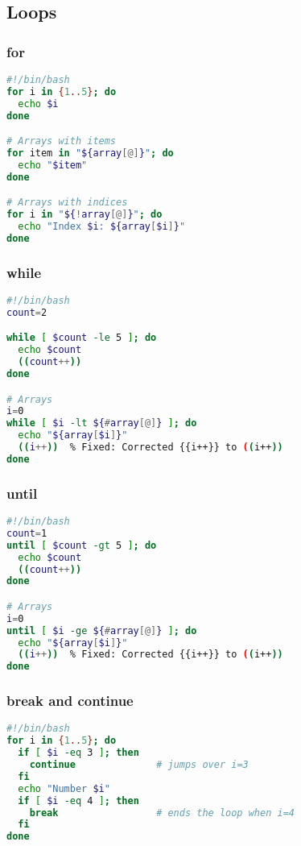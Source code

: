 \documentclass[a4paper,10pt]{article}
\begin{document}
\subsection{Loops}
\subsubsection*{for}
\begin{lstlisting}[language=bash]
#!/bin/bash
for i in {1..5}; do
  echo $i
done

# Arrays with items
for item in "${array[@]}"; do 
  echo "$item"
done 

# Arrays with indices
for i in "${!array[@]}"; do 
  echo "Index $i: ${array[$i]}"
done
\end{lstlisting}

\subsubsection*{while}
\begin{lstlisting}[language=bash]
#!/bin/bash
count=2

while [ $count -le 5 ]; do
  echo $count
  ((count++))
done

# Arrays
i=0 
while [ $i -lt ${#array[@]} ]; do 
  echo "${array[$i]}"
  ((i++))  % Fixed: Corrected {{i++}} to ((i++))
done
\end{lstlisting}

\subsubsection*{until}
\begin{lstlisting}[language=bash]
#!/bin/bash
count=1
until [ $count -gt 5 ]; do
  echo $count
  ((count++))
done

# Arrays 
i=0 
until [ $i -ge ${#array[@]} ]; do 
  echo "${array[$i]}"
  ((i++))  % Fixed: Corrected {{i++}} to ((i++))
done
\end{lstlisting}

\subsubsection*{break and continue}
\begin{lstlisting}[language=bash]
#!/bin/bash
for i in {1..5}; do
  if [ $i -eq 3 ]; then
    continue              # jumps over i=3
  fi
  echo "Number $i"
  if [ $i -eq 4 ]; then
    break                 # ends the loop when i=4
  fi
done
\end{lstlisting}
\end{document}

